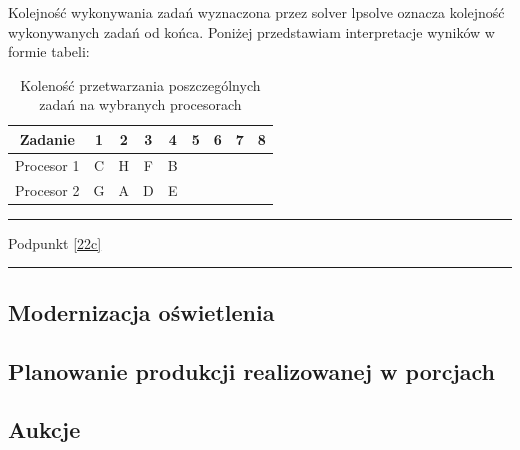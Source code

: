 \documentclass[
    12pt, %
]{../fphw}
\begin{document}
Kolejność wykonywania zadań wyznaczona przez solver lpsolve
oznacza kolejność wykonywanych zadań od końca.
Poniżej przedstawiam interpretacje wyników w formie tabeli:

\begin{table}[H]
    \centering
    \begin{tabular}{| c | c | c | c | c | c | c | c | c |}
        \hline
        Zadanie    & 1 & 2 & 3 & 4 & 5 & 6 & 7 & 8 \\
        \hline
        Procesor 1 & C & H & F & B &   &   &   &   \\
        \hline
        Procesor 2 & G & A & D & E &   &   &   &   \\
        \hline
    \end{tabular}
    \caption{Koleność przetwarzania poszczególnych zadań na wybranych procesorach}
\end{table}

\newpage

\par\noindent\rule{\textwidth}{0.4pt}
Podpunkt \ref{22c}
\par\noindent\rule{\textwidth}{0.4pt}

\subsection{Modernizacja oświetlenia}
\subsection{Planowanie produkcji realizowanej w porcjach}
\subsection{Aukcje}
\end{document}
